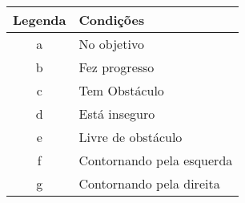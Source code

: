 \begin{table}[ht]
\centering
\vspace{0.2 cm}
\begin{tabular}{|c|l|}
\hline
\textbf{Legenda} & \textbf{Condições}                  \\ \hline
a       & No objetivo                           \\ \hline
b       & Fez progresso                         \\ \hline
c       & Tem Obstáculo                         \\ \hline
d       & Está inseguro                         \\ \hline
e       & Livre de obstáculo                    \\ \hline
f       & Contornando pela esquerda            \\ \hline
g       & Contornando pela direita              \\ \hline
\end{tabular}
\end{table}